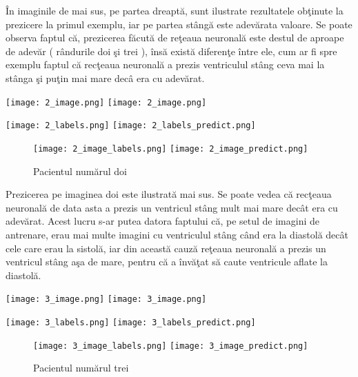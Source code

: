 \^{I}n imaginile de mai sus, pe partea dreapt\u{a}, sunt ilustrate rezultatele ob\c{t}inute la prezicere la primul exemplu, iar pe partea st\^{a}ng\u{a} este adev\u{a}rata valoare. Se poate observa faptul c\u{a}, prezicerea f\u{a}cut\u{a} de re\c{t}eaua neuronal\u{a} este destul de aproape de adev\u{a}r ( r\^{a}ndurile doi \c{s}i trei ), \^{i}ns\u{a} exist\u{a} diferen\c{t}e \^{i}ntre ele, cum ar fi spre exemplu faptul c\u{a} rec\c{t}eaua neuronal\u{a} a prezis ventriculul st\^{a}ng ceva mai la st\^{a}nga \c{s}i pu\c{t}in mai mare dec\^{a} era cu adev\u{a}rat.

\begin{center}
\texttt{[image: 2\_image.png]}
\texttt{[image: 2\_image.png]}
\end{center}

\begin{center}
\texttt{[image: 2\_labels.png]}
\texttt{[image: 2\_labels\_predict.png]}
\end{center}

\begin{figure}[h!]
  \center
  \texttt{[image: 2\_image\_labels.png]}
\texttt{[image: 2\_image\_predict.png]}
  \caption{Pacientul num\u{a}rul doi}
\end{figure}

Prezicerea pe imaginea doi este ilustrat\u{a} mai sus. Se poate vedea c\u{a} rec\c{t}eaua neuronal\u{a} de data asta a prezis un ventricul st\^{a}ng mult mai mare dec\^{a}t era cu adev\u{a}rat. Acest lucru s-ar putea datora faptului c\u{a}, pe setul de imagini de antrenare, erau mai multe imagini cu ventriculul st\^{a}ng c\^{a}nd era la diastol\u{a} dec\^{a}t cele care erau la sistol\u{a}, iar din aceast\u{a} cauz\u{a} re\c{t}eaua neuronal\u{a} a prezis un ventricul st\^{a}ng a\c{s}a de mare, pentru c\u{a} a \^{i}nv\u{a}\c{t}at s\u{a} caute ventricule aflate la diastol\u{a}.

\begin{center}
\texttt{[image: 3\_image.png]}
\texttt{[image: 3\_image.png]}
\end{center}

\begin{center}
\texttt{[image: 3\_labels.png]}
\texttt{[image: 3\_labels\_predict.png]}
\end{center}

\begin{figure}[h!]
  \center
  \texttt{[image: 3\_image\_labels.png]}
\texttt{[image: 3\_image\_predict.png]}
  \caption{Pacientul num\u{a}rul trei}
\end{figure}

